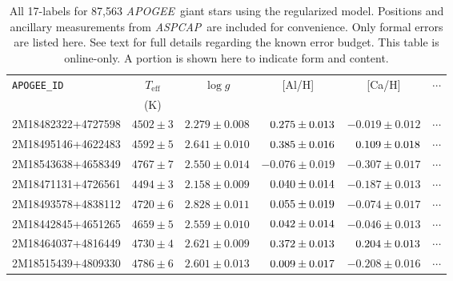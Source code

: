\documentclass[12pt,preprint]{aastex6}
\newcommand{\project}[1]{\textsl{#1}}
\newcommand{\acronym}[1]{{\small{#1}}}
\newcommand{\apogee}{\project{\acronym{APOGEE}}}
\newcommand{\aspcap}{\project{\acronym{ASPCAP}}}
\newcommand{\logg}{\log g}
\newcommand{\Teff}{T_{\mathrm{eff}}}
\newcommand{\pn}{\hphantom{-}}
\begin{document}
\clearpage

\begin{table}
\centering
\begin{tabular}{lccccc}
\hline
\texttt{APOGEE\_ID} & $\Teff$ & $\logg$ & [Al/H] & [Ca/H] & $\cdots$ \\
& (K) & & & \\
\hline
2M18482322+4727598 & $4502 \pm 3$ & $2.279 \pm 0.008$ & $\pn0.275 \pm 0.013$ & $-0.019   \pm 0.012$ & $\cdots$ \\
2M18495146+4622483 & $4592 \pm 5$ & $2.641 \pm 0.010$ & $\pn0.385 \pm 0.016$ & $\pn0.109 \pm 0.018$ & $\cdots$ \\
2M18543638+4658349 & $4767 \pm 7$ & $2.550 \pm 0.014$ & $-0.076   \pm 0.019$ & $-0.307   \pm 0.017$ & $\cdots$ \\
2M18471131+4726561 & $4494 \pm 3$ & $2.158 \pm 0.009$ & $\pn0.040 \pm 0.014$ & $-0.187   \pm 0.013$ & $\cdots$ \\
2M18493578+4838112 & $4720 \pm 6$ & $2.828 \pm 0.011$ & $\pn0.055 \pm 0.019$ & $-0.074   \pm 0.017$ & $\cdots$ \\
2M18442845+4651265 & $4659 \pm 5$ & $2.559 \pm 0.010$ & $\pn0.042 \pm 0.014$ & $-0.046   \pm 0.013$ & $\cdots$ \\
2M18464037+4816449 & $4730 \pm 4$ & $2.621 \pm 0.009$ & $\pn0.372 \pm 0.013$ & $\pn0.204 \pm 0.013$ & $\cdots$ \\
2M18515439+4809330 & $4786 \pm 6$ & $2.601 \pm 0.013$ & $\pn0.009 \pm 0.017$ & $-0.208   \pm 0.016$ & $\cdots$ \\
\hline
\end{tabular}
\caption{All 17-labels for 87,563 \apogee\ giant stars using the regularized model. Positions and ancillary measurements from \aspcap\ are included for convenience. Only formal errors are listed here. See text for full details regarding the known error budget.  This table is online-only. A portion is shown here to indicate form and content.}
\label{tab:the-good-stuff}
\end{table}
\end{document}

